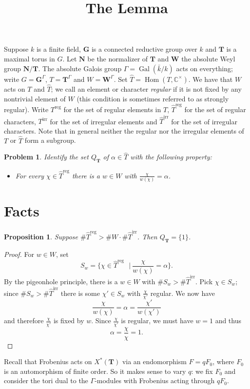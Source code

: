 \documentclass[11pt]{amsart}
\theoremstyle{plain}
\newtheorem{proposition}[theorem]{Proposition}
\newtheorem*{problem}{Problem}
\theoremstyle{definition}
\DeclareMathOperator{\Gal}{Gal}
\DeclareMathOperator{\Hom}{Hom}
\newcommand{\stupid}{\ensuremath{\ \ \ \vert\ }}
\newcommand{\CC}{\mathbb{C}}
\newcommand{\T}{\mathbf{T}}
\newcommand{\G}{\mathbf{G}}
\newcommand{\N}{\mathbf{N}}
\newcommand{\W}{\mathbf{W}}
\newcommand{\Galk}{\Gamma}
\newcommand{\hatT}{\hat{T}}
\newcommand{\Treg}{T^{\operatorname{reg}}}
\newcommand{\Threg}{\hatT^{\operatorname{reg}}}
\newcommand{\Tirr}{T^{\operatorname{irr}}}
\newcommand{\Thirr}{\hatT^{\operatorname{irr}}}
\begin{document}
\title{The Lemma}

Suppose $k$ is a finite field, $\G$ is a connected reductive group over $k$ and $\T$ is a maximal torus in $G$.  Let $\N$ be the normalizer of $\T$ and $\W$ the absolute Weyl group $\N / \T$.  The absolute Galois group $\Galk = \Gal(\bar{k}/k)$ acts on everything; write $G = \G^\Galk$, $T = \T^\Galk$ and $W = \W^\Galk$.  Set $\hatT = \Hom(T, \CC^\times)$.  We have that $W$ acts on $T$ and $\hat{T}$; we call an element or character \emph{regular} if it is not fixed by any nontrivial element of $W$ (this condition is sometimes referred to as strongly regular).  Write $\Treg$ for the set of regular elements in $T$, $\Threg$ for the set of regular characters, $\Tirr$ for the set of irregular elements and $\Thirr$ for the set of irregular characters.  Note that in general neither the regular nor the irregular elements of $T$ or $\hatT$ form a subgroup.

\begin{problem}
Identify the set $Q_{\T}$ of $\alpha \in \hatT$ with the following property:
\begin{itemize}
\item For every $\chi \in \Threg$ there is a $w \in W$ with $\frac{\chi}{w(\chi)} = \alpha$.
\end{itemize}
\end{problem}

\section{Facts}

\begin{proposition}
Suppose $\#\Threg > \# W \cdot \# \Thirr$.  Then $Q_{\T} = \{ 1 \}$.
\end{proposition}
\begin{proof}
For $w \in W$, set
$$S_w = \{\chi \in \Threg \stupid  \frac{\chi}{w(\chi)} = \alpha\}.$$
By the pigeonhole principle, there is a $w \in W$ with $\# S_w > \# \Thirr$.  Pick $\chi \in S_w$; since $\# S_w > \#\Thirr$ there is some $\chi' \in S_w$ with $\frac{\chi}{\chi'}$ regular.  We now have
$$\frac{\chi}{w(\chi)} = \alpha = \frac{\chi'}{w(\chi')}$$
and therefore $\frac{\chi}{\chi'}$ is fixed by $w$.  Since $\frac{\chi}{\chi'}$ is regular, we must have $w = 1$ and thus 
$$\alpha = \frac{\chi}{\chi} = 1.$$
\end{proof}

Recall that Frobenius acts on $X^*(\T)$ via an endomorphism $F = qF_0$, where $F_0$ is an automorphism of finite order.  So it makes sense to vary $q$: we fix $F_0$ and consider the tori dual to the $\Galk$-modules with Frobenius acting through $qF_0$.
\end{document}
